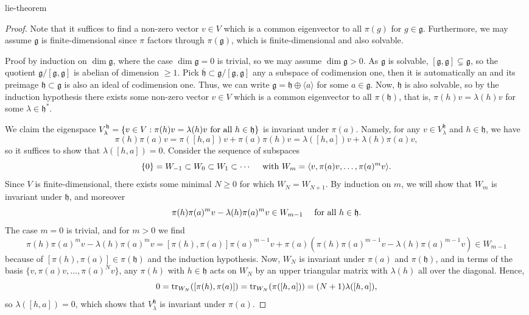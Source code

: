 \begin{example}{lie-theorem}
    \begin{proof}
        Note that it suffices to find a non-zero vector $v \in V$ which is a common eigenvector to all $\pi(g)$ for $g \in \mathfrak{g}$. Furthermore, we may assume $\mathfrak{g}$ is finite-dimensional since $\pi$ factors through $\pi(\mathfrak{g})$, which is finite-dimensional and also solvable.
        
        Proof by induction on $\dim \mathfrak{g}$, where the case $\dim \mathfrak{g} = 0$ is trivial, so we may assume $\dim \mathfrak{g} > 0$. As $\mathfrak{g}$ is solvable, $[\mathfrak{g}, \mathfrak{g}] \subsetneq \mathfrak{g}$, so the quotient $\mathfrak{g} / [\mathfrak{g}, \mathfrak{g}]$ is abelian of dimension $\ge 1$. Pick $\overline{\mathfrak{h}} \subset \mathfrak{g} / [\mathfrak{g}, \mathfrak{g}]$ any a subspace of codimension one, then it is automatically an  and its preimage $\mathfrak{h} \subset \mathfrak{g}$ is also an ideal of codimension one. Thus, we can write $\mathfrak{g} = \mathfrak{h} \oplus \langle a \rangle$ for some $a \in \mathfrak{g}$. Now, $\mathfrak{h}$ is also solvable, so by the induction hypothesis there exists some non-zero vector $v \in V$ which is a common eigenvector to all $\pi(\mathfrak{h})$, that is, $\pi(h) v = \lambda(h) v$ for some $\lambda \in \mathfrak{h}^*$.
        
        We claim the eigenspace $V^\mathfrak{h}_\lambda = \{ v \in V : \pi(h) v = \lambda(h) v \textup{ for all } h \in \mathfrak{h} \}$ is invariant under $\pi(a)$. Namely, for any $v \in V^\mathfrak{h}_\lambda$ and $h \in \mathfrak{h}$, we have
        \[ \pi(h) \pi(a) v = \pi([h, a]) v + \pi(a) \pi(h) v = \lambda([h, a]) v + \lambda(h) \pi(a) v , \]
        so it suffices to show that $\lambda([h, a]) = 0$. Consider the sequence of subspaces
        \[ \{ 0 \} = W_{-1} \subset W_0 \subset W_1 \subset \cdots \quad \textup{ with }  W_m = \langle v, \pi(a) v, \ldots, \pi(a)^m v \rangle . \]
        Since $V$ is finite-dimensional, there exists some minimal $N \ge 0$ for which $W_N = W_{N + 1}$. By induction on $m$, we will show that $W_m$ is invariant under $\mathfrak{h}$, and moreover
        \[ \pi(h) \pi(a)^m v - \lambda(h) \pi(a)^m v \in W_{m - 1} \quad \textup{ for all } h \in \mathfrak{h} . \]
        The case $m = 0$ is trivial, and for $m > 0$ we find
        \[ \pi(h)\pi(a)^m v - \lambda(h) \pi(a)^m v = [\pi(h), \pi(a)] \pi(a)^{m - 1} v + \pi(a) \left( \pi(h) \pi(a)^{m - 1} v - \lambda(h) \pi(a)^{m - 1} v \right) \in W_{m - 1} \]
        because of $[\pi(h), \pi(a)] \in \pi(\mathfrak{h})$ and the induction hypothesis. Now, $W_N$ is invariant under $\pi(a)$ and $\pi(\mathfrak{h})$, and in terms of the basis $\{ v, \pi(a) v, \ldots, \pi(a)^N v \}$, any $\pi(h)$ with $h \in \mathfrak{h}$ acts on $W_N$ by an upper triangular matrix with $\lambda(h)$ all over the diagonal. Hence,
        \[ 0 = \operatorname{tr}_{W_N}([\pi(h), \pi(a)]) = \operatorname{tr}_{W_N}(\pi([h, a])) = (N + 1) \lambda([h, a]) , \]
        so $\lambda([h, a]) = 0$, which shows that $V^\mathfrak{h}_\lambda$ is invariant under $\pi(a)$.
        

\end{proof}
\end{example}
